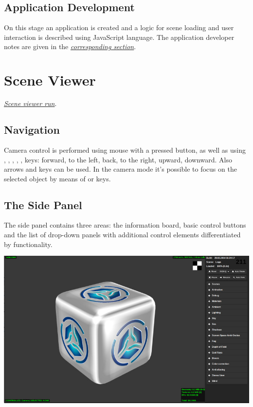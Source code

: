 \documentclass[a4paper,12pt,oneside]{sphinxmanual}
\begin{document}
\section{Application Development}
\label{workflow:id7}
On this stage an application is created and a logic for scene loading and user interaction is described using JavaScript language. The application developer notes are given in the {\hyperref[developers:developers]{\emph{corresponding section}}}.


\chapter{Scene Viewer}
\label{viewer:viewer}\label{viewer:index-0}\label{viewer::doc}\label{viewer:id1}
{\hyperref[setup:getting-started-launching-viewer]{\emph{Scene viewer run}}}.


\section{Navigation}
\label{viewer:id2}
Camera control is performed using mouse with a pressed button, as well as using , , , , ,  keys: forward, to the left, back, to the right, upward, downward. Also arrows and  keys can be used. In the  camera mode it's possible to focus on the selected object by means of  or  keys.


\section{The Side Panel}
\label{viewer:id3}
The side panel contains three areas: the information board, basic control buttons and the list of drop-down panels with additional control elements differentiated by functionality.

{\hfill\includegraphics[width=1.000\linewidth]{default_page.jpg}\hfill}
\end{document}

